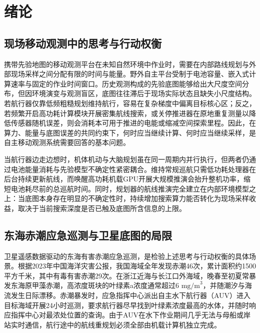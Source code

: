 \section{绪论}

\subsection{现场移动观测中的思考与行动权衡}

携带先验地图的移动观测平台在未知自然环境中作业时，需要在内部路线规划与外部现场采样之间分配有限的时间与能量\cite{horvitz1987reasoning, russell1991right, shen2025thinking}。野外自主平台受制于电池容量、嵌入式计算速率与固定的作业时间窗口\cite{xiao2020thinking, magnino2026metareasoning}。历史观测构成的先验底图能够给出大尺度空间分布，但因环境演变与观测盲区，底图往往滞后于现场实际状态且缺失小尺度结构\cite{jiang2015horizon}。若航行器仅靠低频粗糙规划维持航行，容易在复杂梯度中偏离目标核心区；反之，若频繁开启高功耗计算模块开展密集航线搜索，或关停推进器在原地重复测量以降低传感器随机误差，则会消耗本可用于推进的电能或缩减空间探索里程\cite{cuadron2025overthinking, elboher2023formal}。因此，在算力、能量与底图误差的共同约束下，何时应当继续计算、何时应当继续采样，是自主移动观测系统需要回答的基本问题\cite{hunt2021formalizing}。

当航行器边走边想时，机体机动与大脑规划虽在同一周期内并行执行，但两者仍通过电池能量消耗与先验模型不确定性紧密耦合\cite{xiao2020thinking, elboher2023formal}。维持常规巡航只需低功耗处理器在后台持续更新航线，而唤醒高功耗机载GPU开展大规模推演会抬升整机功率，缩短电池耗尽前的总巡航时间。同时，规划器的航线推演完全建立在内部环境模型之上：当底图本身存在明显的不确定性时，持续增加搜索算力能否转化为现场采样收益，取决于当前搜索深度是否已触及底图所含信息的上限\cite{jiang2015horizon, smith2006curse}。

\subsection{东海赤潮应急巡测与卫星底图的局限}

卫星遥感数据驱动的东海有害赤潮应急巡测，是检验上述思考与行动权衡的具体场景\cite{fossum2019, lou2014diurnal}。根据2023年中国海洋灾害公报，我国海域全年发现赤潮46次，累计面积约1500平方千米，其中有毒有害赤潮29次\cite{mnr2024bulletin}。在浙江近海与长江口外海域，晚春至初夏常暴发东海原甲藻赤潮，高浓度斑块的叶绿素a浓度通常超过$6\text{ mg/m}^3$，并随潮汐与海流发生日际漂移\cite{lou2014diurnal}。赤潮暴发时，应急指挥中心派出自主水下航行器（AUV）进入目标海域开展24小时巡测，要求航行器尽早找到叶绿素浓度最高的水体，并随时响应指挥中心对最浓处位置的查询\cite{fossum2019, remus100}。由于AUV在水下作业期间几乎无法与母船或岸站实时通信，航行途中的航线重规划必须全部由机载计算机独立完成。

